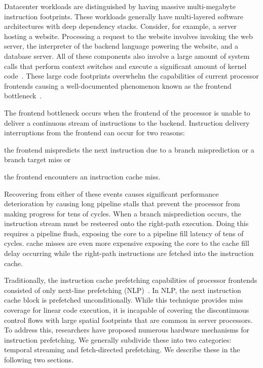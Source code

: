\documentclass[../main.tex]{subfiles}
\begin{document}
\begin{refsection}
Datacenter workloads are distinguished by having massive
multi-megabyte instruction footprints. These workloads generally have
multi-layered software architectures with deep dependency
stacks. Consider, for example, a server hosting a website. Processing a request to the website involves invoking the web server, the
interpreter of the backend language powering the website, and a
database server. All of these components also involve a large amount
of system calls that perform context switches and execute a
significant amount of kernel
code~\cite{ferdman12_clear_cloud,ailamaki99_dbmss_moder_proces}. These large code footprints overwhelm the capabilities of current processor frontends causing a well-documented phenomenon known as the frontend
bottleneck~\cite{kanev15_profil,ferdman12_clear_cloud,ayers19_asmdb,kanev15_profil,kumar17_boomer,kumar18_blast_throug_front_end_bottl_with_shotg,kumar20_shoot_down_server_front_end_bottl,spracklen05_effec_instr_prefet_chip_multip}.


The frontend bottleneck occurs when the frontend of the processor is
unable to deliver a continuous stream of instructions to the backend.
Instruction delivery interruptions from the frontend can occur for two
reasons: \begin{inparaenum}[1)] \item the frontend mispredicts the
  next instruction due to a branch misprediction or a branch target
  miss or \item the frontend encounters an instruction cache
  miss.\end{inparaenum} Recovering from either of these events causes significant performance deterioration by causing long pipeline stalls that prevent the processor from making progress for tens of cycles. When a branch misprediction occurs, the instruction stream must be resteered onto the right-path execution. Doing this requires a
pipeline flush, exposing the core to a pipeline fill latency of tens
of cycles.  cache misses are even more expensive exposing the core
to the cache fill delay occurring while the right-path instructions are
fetched into the instruction cache.

Traditionally, the instruction cache prefetching capabilities of
processor frontends consisted of only next-line prefetching
(NLP)~\cite{nextline_pref}. In NLP, the next instruction cache block
is prefetched unconditionally. While this technique provides miss
coverage for linear code execution, it is incapable of covering the
discontinuous control flows with large spatial footprints that are
common in server processors. To address this, researchers have
proposed numerous hardware mechanisms for instruction prefetching. We
generally subdivide these into two categories: temporal streaming and
fetch-directed prefetching. We describe these in the following two
sections.


\end{refsection}
\end{document}
